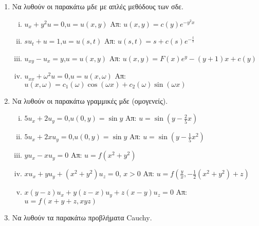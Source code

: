 



\thispagestyle{empty}



\begin{center}
\end{center}

\vspace{\baselineskip}

\begin{enumerate}
  \item Να λυθούν οι παρακάτω μδε με απλές μεθόδους των σδε.
    \begin{enumerate}[i)]
      \item $u_{x}+y^{2}u=0$,\quad $u=u(x,y)$ \hfill Απ: $u(x,y)=c(y)e^{-y^{2}x}$
      \item $su_{t}+u=1$,\quad $u=u(s,t)$ \hfill Απ: $u(s,t)=s+c(s)e^{-\frac{t}{s}}$
      \item $u_{xy}-u_{x}=y$,\quad $u=u(x,y)$ \hfill Απ: $u(x,y)=F(x)e^{y}-(y+1)x+c(y)$
      \item $u_{xx}+\omega^{2}u=0$,\quad $u=u(x,\omega)$ \hfill Απ: $u(x,\omega)=c_{1}(\omega)\cos(\omega x)+c_{2}(\omega)\sin(\omega x)$
    \end{enumerate}

\item Να λυθούν οι παρακάτω γραμμικές μδε (ομογενείς).

  \begin{enumerate}[i)]
    \item $5u_{x}+2u_{y}=0$,\quad $u(0,y)=\sin y$  \hfill Απ: $u=\sin(y-\frac{2}{5}x)$
    \item $5u_{x}+2xu_{y}=0$,\quad $u(0,y)=\sin y$ \hfill Απ: $u=\sin(y-\frac{1}{5}x^{2})$
    \item $yu_{x}-xu_{y}=0$ \hfill Απ: $u=f(x^{2}+y^{2})$
    \item $xu_{x}+yu_{y}+(x^{2}+y^{2})u_{z}=0$, \quad $x>0$ \hfill Απ: $u=f(\frac{y}{x},-\frac{1}{2}(x^{2}+y^{2})+z)$
    \item $x(y-z)u_{x}+y(z-x)u_{y}+z(x-y)u_{z}=0$ \hfill Απ: $u=f(x+y+z,xyz)$
  \end{enumerate}
  
  
 \item Να λυθούν τα παρακάτω προβλήματα \textlatin{Cauchy}.


\end{enumerate}
